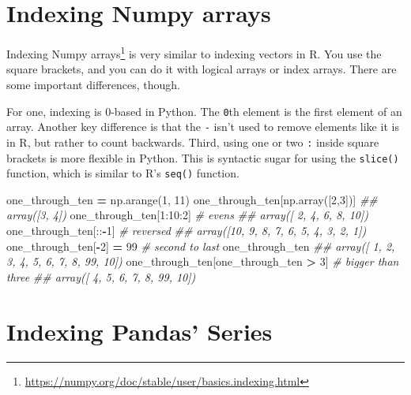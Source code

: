 \documentclass[
  12pt,
  krantz2]{krantz}
\makeatletter
\newenvironment{Shaded}{\begin{snugshade}}{\end{snugshade}}
\newcommand{\CommentTok}[1]{\textcolor[rgb]{0.37,0.37,0.37}{\textit{#1}}}
\newcommand{\DecValTok}[1]{\textcolor[rgb]{0.06,0.06,0.06}{#1}}
\newcommand{\NormalTok}[1]{#1}
\newcommand{\OperatorTok}[1]{\textcolor[rgb]{0.43,0.43,0.43}{\textbf{#1}}}
\renewcommand{\href}[2]{#2\footnote{\url{#1}}}
\newenvironment{kframe}{%
\medskip{}
\setlength{\fboxsep}{.8em}
 \def\at@end@of@kframe{}%
 \ifinner\ifhmode%
  \def\at@end@of@kframe{\end{minipage}}%
  \begin{minipage}{\columnwidth}%
 \fi\fi%
 \def\FrameCommand##1{\hskip\@totalleftmargin \hskip-\fboxsep
 \colorbox{shadecolor}{##1}\hskip-\fboxsep
     \hskip-\linewidth \hskip-\@totalleftmargin \hskip\columnwidth}%
 \MakeFramed {\advance\hsize-\width
   \@totalleftmargin\z@ \linewidth\hsize
   \@setminipage}}%
 {\par\unskip\endMakeFramed%
 \at@end@of@kframe}
\renewenvironment{Shaded}{\begin{kframe}}{\end{kframe}}
\makeatother
\begin{document}
\hypertarget{indexing-numpy-arrays}{%
\section{Indexing Numpy arrays}\label{indexing-numpy-arrays}}

\href{https://numpy.org/doc/stable/user/basics.indexing.html}{Indexing Numpy arrays} is very similar to indexing vectors in R. You use the square brackets, and you can do it with logical arrays or index arrays. There are some important differences, though.

For one, indexing is 0-based in Python. The \texttt{0}th element is the first element of an array. Another key difference is that the \texttt{-} isn't used to remove elements like it is in R, but rather to count backwards. Third, using one or two \texttt{:} inside square brackets is more flexible in Python. This is syntactic sugar for using the \texttt{slice()} function, which is similar to R's \texttt{seq()} function.

\begin{Shaded}
\begin{Highlighting}[]
\NormalTok{one\_through\_ten }\OperatorTok{=}\NormalTok{ np.arange(}\DecValTok{1}\NormalTok{, }\DecValTok{11}\NormalTok{)}
\NormalTok{one\_through\_ten[np.array([}\DecValTok{2}\NormalTok{,}\DecValTok{3}\NormalTok{])]}
\CommentTok{\#\# array([3, 4])}
\NormalTok{one\_through\_ten[}\DecValTok{1}\NormalTok{:}\DecValTok{10}\NormalTok{:}\DecValTok{2}\NormalTok{] }\CommentTok{\# evens}
\CommentTok{\#\# array([ 2,  4,  6,  8, 10])}
\NormalTok{one\_through\_ten[::}\OperatorTok{{-}}\DecValTok{1}\NormalTok{] }\CommentTok{\# reversed}
\CommentTok{\#\# array([10,  9,  8,  7,  6,  5,  4,  3,  2,  1])}
\NormalTok{one\_through\_ten[}\OperatorTok{{-}}\DecValTok{2}\NormalTok{] }\OperatorTok{=} \DecValTok{99} \CommentTok{\# second to last}
\NormalTok{one\_through\_ten}
\CommentTok{\#\# array([ 1,  2,  3,  4,  5,  6,  7,  8, 99, 10])}
\NormalTok{one\_through\_ten[one\_through\_ten }\OperatorTok{\textgreater{}} \DecValTok{3}\NormalTok{] }\CommentTok{\# bigger than three}
\CommentTok{\#\# array([ 4,  5,  6,  7,  8, 99, 10])}
\end{Highlighting}
\end{Shaded}

\hypertarget{indexing-pandas-series}{%
\section{Indexing Pandas' Series}\label{indexing-pandas-series}}
\end{document}

